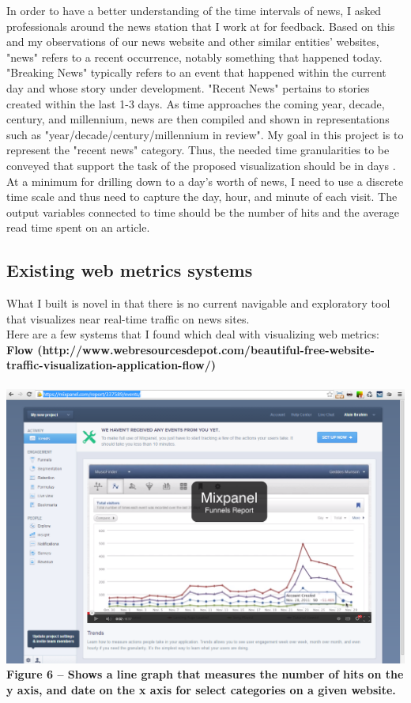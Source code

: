 \documentclass[12pt]{article}
\begin{document}
In order to have a better understanding of the time intervals of news, I asked professionals around the news station that I work at for feedback. Based on this and my observations of our news website and other similar entities' websites, "news" refers to a recent occurrence, notably something that happened today. "Breaking News" typically refers to an event that happened within the current day and whose story under development. "Recent News" pertains to stories created within the last 1-3 days. As time approaches the coming year, decade, century, and millennium, news are then compiled and shown in representations such as "year/decade/century/millennium in review". My goal in this project is to represent the "recent news" category. Thus, the needed time granularities to be conveyed that support the task of the proposed visualization should be in days \cite{bettini}. At a minimum for drilling down to a day's worth of news, I need to use a discrete time scale \cite{goralwalla} and thus need to capture the day, hour, and minute of each visit. The output variables connected to time should be the number of hits and the average read time spent on an article.

\subsection{Existing web metrics systems}
What I built is novel in that there is no current navigable and exploratory tool that visualizes near real-time traffic on news sites. \\
Here are a few systems that I found which deal with visualizing web metrics: \\

\noindent\textbf{Flow (http://www.webresourcesdepot.com/beautiful-free-website-traffic-visualization-application-flow/)} \\ \\
\noindent\includegraphics[scale=0.45]{img/flow}
\noindent\textbf{Figure 6 -- Shows a line graph that measures the number of hits on the y axis, and date on the x axis for select categories on a given website.} \\
\end{document}
